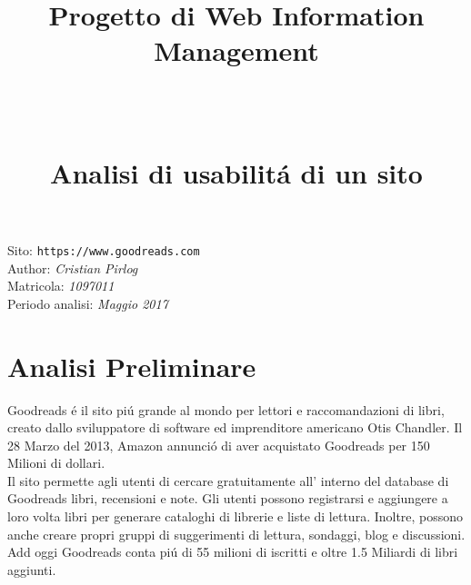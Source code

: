 \documentclass[12pt]{article}
\title{%
		\begin{Huge}Progetto di Web Information Management\end{Huge} \\
		\begin{Large}
		Analisi di usabilit\'a di un sito
		\end{Large}
}
\date{\vspace{-2ex}}
\begin{document}
\maketitle
\vspace{40ex}

\noindent Sito: \texttt{https://www.goodreads.com}\\

\noindent Author: \textit{Cristian Pirlog}\\
\noindent Matricola: \textit{1097011}\\
\noindent Periodo analisi: \textit{Maggio 2017}
\newpage

\tableofcontents
\newpage

\section{Analisi Preliminare}
Goodreads \'e il sito pi\'u grande al mondo per lettori e raccomandazioni di libri, creato dallo sviluppatore di software ed imprenditore americano Otis Chandler. Il 28 Marzo del 2013, Amazon annunci\'o di aver acquistato Goodreads per 150 Milioni di dollari. \\
Il sito permette agli utenti di cercare gratuitamente all' interno del database di Goodreads libri, recensioni e note. Gli utenti possono registrarsi e aggiungere a loro volta libri per generare cataloghi di librerie e liste di lettura. Inoltre, possono anche creare propri gruppi di suggerimenti di lettura, sondaggi, blog e discussioni. \\
Add oggi Goodreads conta pi\'u di 55 milioni di iscritti e oltre 1.5 Miliardi di libri aggiunti.
\end{document}
